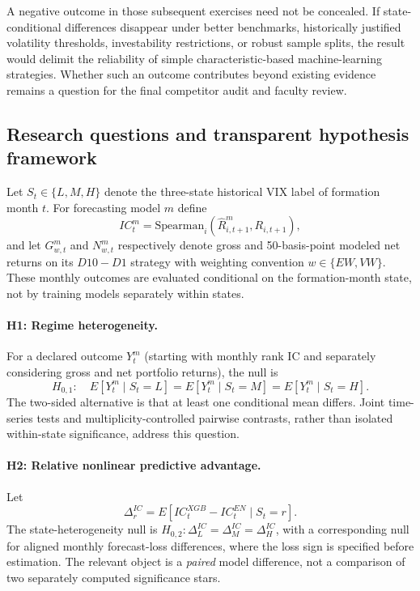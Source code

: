 A negative outcome in those subsequent exercises need not be concealed.
If state-conditional differences disappear under better benchmarks,
historically justified volatility thresholds, investability restrictions,
or robust sample splits, the result would delimit the reliability
of simple characteristic-based machine-learning strategies. Whether such
an outcome contributes beyond existing evidence remains a question
for the final competitor audit and faculty review.

\subsection{Research questions and transparent hypothesis framework}
\label{subsec:literature-hypotheses}

Let $S_t\in\{L,M,H\}$ denote the three-state historical VIX label of
formation month $t$. For forecasting model $m$ define
\begin{equation}
IC_t^{m}=\mathrm{Spearman}_{i}
 \left(\widehat R_{i,t+1}^{m},R_{i,t+1}\right),
\end{equation}
and let $G_{w,t}^{m}$ and $N_{w,t}^{m}$ respectively denote gross and
50-basis-point modeled net returns on its $D10-D1$ strategy with
weighting convention $w\in\{EW,VW\}$. These monthly outcomes are
evaluated conditional on the formation-month state, not by
training models separately within states.

\paragraph{H1: Regime heterogeneity.}
For a declared outcome $Y_t^m$ (starting with monthly rank IC and
separately considering gross and net portfolio returns), the null is
\begin{equation}
H_{0,1}:\quad
 E[Y_t^m\mid S_t=L]=E[Y_t^m\mid S_t=M]
 =E[Y_t^m\mid S_t=H].
\end{equation}
The two-sided alternative is that at least one conditional mean differs.
Joint time-series tests and multiplicity-controlled pairwise contrasts,
rather than isolated within-state significance, address this question.

\paragraph{H2: Relative nonlinear predictive advantage.}
Let
\begin{equation}
\Delta_r^{IC}
 = E[IC_t^{XGB}-IC_t^{EN}\mid S_t=r].
\end{equation}
The state-heterogeneity null is
$H_{0,2}:\Delta_L^{IC}=\Delta_M^{IC}=\Delta_H^{IC}$,
with a corresponding null for aligned monthly forecast-loss
differences, where the loss sign is specified before estimation.
The relevant object is a \emph{paired} model difference, not
a comparison of two separately computed significance stars.

